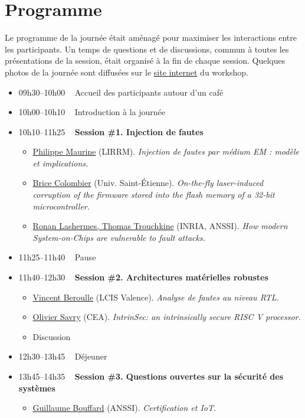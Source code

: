 \documentclass[a4paper,11pt]{article}
\begin{document}
\section{Programme}
\label{sec:orgc94b13c}
Le programme de la journée était aménagé pour maximiser les
interactions entre les participants.  Un temps de questions et de
discussions, commun à toutes les présentations de la session, était
organisé à la fin de chaque session.
Quelques photos de la journée sont diffusées sur le \href{https://jaif2019.github.io/photos.html}{site
internet} du workshop.

\begin{itemize}
\item 09h30--10h00   Accueil des participants autour d’un café
\item 10h00--10h10   Introduction à la journée
\item 10h10--11h25   \textbf{Session \#1. Injection de fautes}
\begin{itemize}
\item \hyperref[sec:org6eab62c]{Philippe Maurine} (LIRRM). \emph{Injection de fautes par médium EM : modèle et implications.}
\item \hyperref[sec:org6e67d3e]{Brice Colombier} (Univ. Saint-Étienne). \emph{On-the-fly laser-induced corruption of the firmware stored into the flash memory of a 32-bit microcontroller.}
\item \hyperref[sec:org0e9f137]{Ronan Lashermes, Thomas Trouchkine} (INRIA, ANSSI). \emph{How modern System-on-Chips are vulnerable to fault attacks.}
\end{itemize}
\item 11h25--11h40   Pause
\item 11h40--12h30   \textbf{Session \#2. Architectures matérielles robustes}
\begin{itemize}
\item \hyperref[sec:org4193ecc]{Vincent Beroulle} (LCIS Valence). \emph{Analyse de fautes au niveau RTL.}
\item \hyperref[sec:org5ab65bf]{Olivier Savry} (CEA). \emph{IntrinSec: an intrinsically secure RISC V processor.}
\item Discussion
\end{itemize}
\item 12h30--13h45   Déjeuner
\item 13h45--14h35   \textbf{Session \#3. Questions ouvertes sur la sécurité des systèmes}
\begin{itemize}
\item \hyperref[sec:org168486e]{Guillaume Bouffard} (ANSSI). \emph{Certification et IoT.}

\end{itemize}
\end{itemize}
\end{document}
